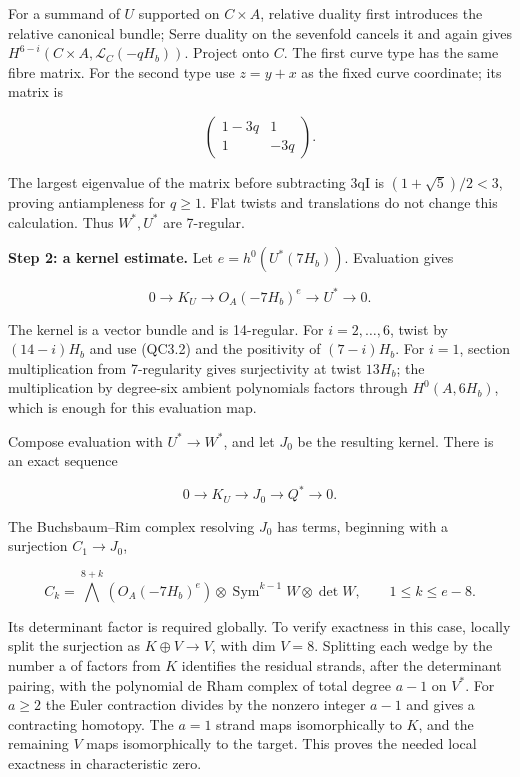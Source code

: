 For a summand of \(U\) supported on \(C\times A\), relative duality
first introduces the relative canonical bundle; Serre duality on the
sevenfold cancels it and again gives
\(H^{6-i}(C\times A,\mathcal L_C(-qH_b))\). Project onto \(C\). The
first curve type has the same fibre matrix. For the second type use
\(z=y+x\) as the fixed curve coordinate; its matrix is

\[
 \begin{pmatrix}1-3q&1\\1&-3q\end{pmatrix}.
\]

The largest eigenvalue of the matrix before subtracting 3qI is
\((1+\sqrt 5)/2<3\), proving antiampleness for \(q\ge 1\). Flat twists
and translations do not change this calculation. Thus \(W^*,U^*\) are
7-regular.

\textbf{Step 2: a kernel estimate.} Let \(e=h^{0}(U^*(7H_b))\).
Evaluation gives

\[
 0\to K_U\to O_A(-7H_b)^e\to U^*\to0.
\]

The kernel is a vector bundle and is 14-regular. For \(i=2,\ldots ,6\),
twist by \((14-i)H_b\) and use (QC3.2) and the positivity of
\((7-i)H_b\). For \(i=1\), section multiplication from 7-regularity
gives surjectivity at twist \(13H_b\); the multiplication by degree-six
ambient polynomials factors through \(H^{0}(A,6H_b)\), which is enough
for this evaluation map.

Compose evaluation with \(U^*\to W^*\), and let \(J_{0}\) be the
resulting kernel. There is an exact sequence

\[
 0\to K_U\to J_0\to Q^*\to0.
 \tag{QC3.3}
\]

The Buchsbaum--Rim complex resolving \(J_{0}\) has terms, beginning with
a surjection \(C_{1}\to J_{0}\),

\[
 C_k=\bigwedge^{8+k}(O_A(-7H_b)^e)
       \otimes\operatorname{Sym}^{k-1}W\otimes\det W,
 \qquad 1\le k\le e-8.
 \tag{QC3.4}
\]

Its determinant factor is required globally. To verify exactness in this
case, locally split the surjection as \(K\oplus V\to V\), with dim
\(V=8\). Splitting each wedge by the number a of factors from \(K\)
identifies the residual strands, after the determinant pairing, with the
polynomial de Rham complex of total degree \(a-1\) on \(V^*\). For
\(a\ge 2\) the Euler contraction divides by the nonzero integer \(a-1\)
and gives a contracting homotopy. The \(a=1\) strand maps isomorphically
to \(K\), and the remaining \(V\) maps isomorphically to the target.
This proves the needed local exactness in characteristic zero.

